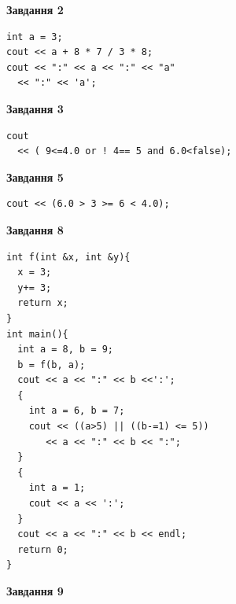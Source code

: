 \documentclass[12pt, ukrainian]{article}
\begin{document}
{\begin {large}
\begin{minipage}[t]{7.0cm}
\end{minipage}
\vline \hspace{1mm}
\begin{minipage}[t]{11.0cm}

\begin{center}
\textbf{Завдання 2}
\end{center}
\vspace{-8mm}

\begin{verbatim}
int a = 3;
cout << a + 8 * 7 / 3 * 8;
cout << ":" << a << ":" << "a" 
  << ":" << 'a';
\end{verbatim}



\begin{center}
\textbf{Завдання 3}
\end{center}
\vspace{-8mm}

\begin{verbatim}
cout 
  << ( 9<=4.0 or ! 4== 5 and 6.0<false);
\end{verbatim}



\begin{center}
\textbf{Завдання 5}
\end{center}
\vspace{-8mm}

\begin{verbatim}
cout << (6.0 > 3 >= 6 < 4.0);
\end{verbatim}



\begin{center}
\textbf{Завдання 8}
\end{center}
\vspace{-8mm}

\begin{verbatim}
int f(int &x, int &y){
  x = 3;
  y+= 3;
  return x;
}
int main(){
  int a = 8, b = 9;
  b = f(b, a);
  cout << a << ":" << b <<':';
  {
    int a = 6, b = 7;
    cout << ((a>5) || ((b-=1) <= 5))
       << a << ":" << b << ":";
  }
  {
    int a = 1;
    cout << a << ':';
  }
  cout << a << ":" << b << endl;
  return 0;
}
\end{verbatim}

\end{minipage}


\begin{minipage}[t]{7.0cm}

\begin{center}
\textbf{Завдання 9}
\end{center}
\vspace{-8mm}


\end{minipage}
\end{large}}
\end{document}
